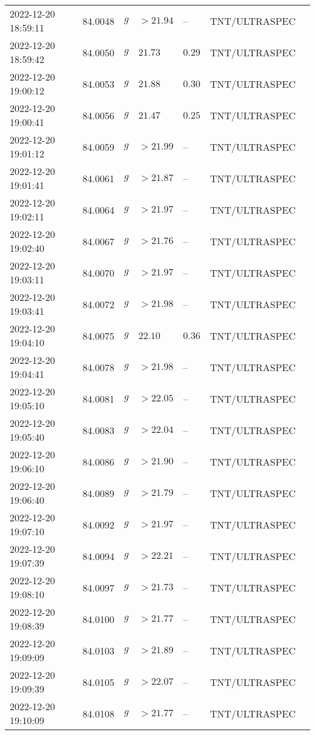 \documentclass{nature_plusfigure}
\begin{document}
\begin{supplement}
\begin{center}
\begin{longtable}{lllllll}
2022-12-20 18:59:11 & 84.0048 & $g$ & $>21.94$ & -- & TNT/ULTRASPEC &  \\ 
2022-12-20 18:59:42 & 84.0050 & $g$ & $21.73$ & $0.29$ & TNT/ULTRASPEC &  \\ 
2022-12-20 19:00:12 & 84.0053 & $g$ & $21.88$ & $0.30$ & TNT/ULTRASPEC &  \\ 
2022-12-20 19:00:41 & 84.0056 & $g$ & $21.47$ & $0.25$ & TNT/ULTRASPEC &  \\ 
2022-12-20 19:01:12 & 84.0059 & $g$ & $>21.99$ & -- & TNT/ULTRASPEC &  \\ 
2022-12-20 19:01:41 & 84.0061 & $g$ & $>21.87$ & -- & TNT/ULTRASPEC &  \\ 
2022-12-20 19:02:11 & 84.0064 & $g$ & $>21.97$ & -- & TNT/ULTRASPEC &  \\ 
2022-12-20 19:02:40 & 84.0067 & $g$ & $>21.76$ & -- & TNT/ULTRASPEC &  \\ 
2022-12-20 19:03:11 & 84.0070 & $g$ & $>21.97$ & -- & TNT/ULTRASPEC &  \\ 
2022-12-20 19:03:41 & 84.0072 & $g$ & $>21.98$ & -- & TNT/ULTRASPEC &  \\ 
2022-12-20 19:04:10 & 84.0075 & $g$ & $22.10$ & $0.36$ & TNT/ULTRASPEC &  \\ 
2022-12-20 19:04:41 & 84.0078 & $g$ & $>21.98$ & -- & TNT/ULTRASPEC &  \\ 
2022-12-20 19:05:10 & 84.0081 & $g$ & $>22.05$ & -- & TNT/ULTRASPEC &  \\ 
2022-12-20 19:05:40 & 84.0083 & $g$ & $>22.04$ & -- & TNT/ULTRASPEC &  \\ 
2022-12-20 19:06:10 & 84.0086 & $g$ & $>21.90$ & -- & TNT/ULTRASPEC &  \\ 
2022-12-20 19:06:40 & 84.0089 & $g$ & $>21.79$ & -- & TNT/ULTRASPEC &  \\ 
2022-12-20 19:07:10 & 84.0092 & $g$ & $>21.97$ & -- & TNT/ULTRASPEC &  \\ 
2022-12-20 19:07:39 & 84.0094 & $g$ & $>22.21$ & -- & TNT/ULTRASPEC &  \\ 
2022-12-20 19:08:10 & 84.0097 & $g$ & $>21.73$ & -- & TNT/ULTRASPEC &  \\ 
2022-12-20 19:08:39 & 84.0100 & $g$ & $>21.77$ & -- & TNT/ULTRASPEC &  \\ 
2022-12-20 19:09:09 & 84.0103 & $g$ & $>21.89$ & -- & TNT/ULTRASPEC &  \\ 
2022-12-20 19:09:39 & 84.0105 & $g$ & $>22.07$ & -- & TNT/ULTRASPEC &  \\ 
2022-12-20 19:10:09 & 84.0108 & $g$ & $>21.77$ & -- & TNT/ULTRASPEC &  \\ 

\end{longtable}
\end{center}
\end{supplement}
\end{document}
